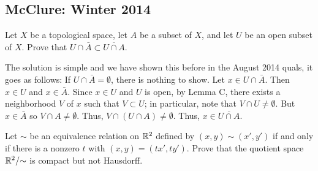 \subsection{McClure:  Winter 2014}
\setcounter{exercise}{0}
\begin{problem}
  Let $X$ be a topological space, let $A$ be a subset of $X$, and let $U$
  be an open subset of $X$. Prove that
  $U\cap\bar A\subset\overline{U\cap A}$.
\end{problem}
\begin{solution}
  The solution is simple and we have shown this before in the August 2014
  quals, it goes as follows: If $U\cap\bar A=\emptyset$, there is nothing
  to show. Let $x\in U\cap\bar A$. Then $x\in U$ and $x\in\bar A$. Since
  $x\in U$ and $U$ is open, by Lemma C, there exists a neighborhood $V$ of
  $x$ such that $V\subset U$; in particular, note that
  $V\cap U\neq\emptyset$. But $x\in\bar A$ so $V\cap A\neq\emptyset$. Thus,
  $V\cap(U\cap A)\neq\emptyset$. Thus, $x\in\overline{U\cap A}$.
\end{solution}
\begin{problem}
  Let $\sim$ be an equivalence relation on $\mathbb{R}^2$ defined by
  $(x,y)\sim(x',y')$ if and only if there is a nonzero $t$ with
  $(x,y)=(tx',ty')$. Prove that the quotient space $\mathbb{R}^2/{\sim}$ is
  compact but not Hausdorff.
\end{problem}
